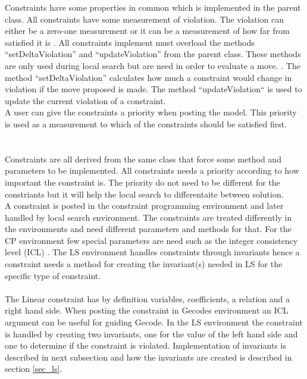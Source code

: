 Constraints have some properties in common which is implemented in the parent class. All constraints have some 
measurement of violation. The violation can either be a zero-one measurement or it can be a measurement of how far 
from satisfied it is . All constraints implement must overload the methods 
``setDeltaViolation'' and ``updateViolation'' from the parent class. These methods are only used during local search but 
are need in order to evaluate a move. . The method ``setDeltaViolation'' calculates how 
much a constraint would change in violation if the move proposed is made. The method ``updateViolation`` is used to 
update the current violation of a constraint. \\
A user can give the constraints a priority when posting the model. This priority is used as a measurement to which of 
the constraints should be satisfied first. \\ 
 \\ \\ 
Constraints are all derived from the same class that force some method and parameters to be implemented. All 
constraints needs a priority according to how important the constraint is. The priority do not need to be different for 
the constriants but it will help the local search to differentaite between solution. 
 \\ 
A constraint is posted in the constraint programming environment and later handled by local search environment. The 
constraints are treated differently in the environments and need different parameters and methods for that. For the 
CP environment few special parameters are need such as the integer consistency level (ICL) . The LS 
environment handles constraints through invariants hence a constraint needs a method for creating the invariant(s) 
needed in LS for the specific type of constraint. \\ 
 \\
The Linear constraint has by definition variables, coefficients, a relation and a right hand side. When posting the 
constraint in Gecodes environment an ICL argument can be useful for guiding Gecode. In the LS environment the 
constraint is handled by creating two invariants, one for the value of the left hand side and one to determine if the 
constraint is violated. Implementation of invariants is described in next subsection and how the invariants are created 
is described in section \ref{sec_ls}. 